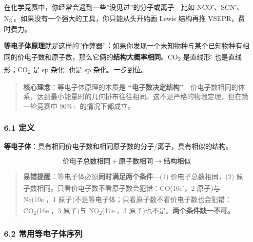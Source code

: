 在化学竞赛中，你经常会遇到一些''没见过''的分子或离子---比如 NCO\textsuperscript{-}、SCN\textsuperscript{-}、N\textsubscript{3}\textsuperscript{-}。如果没有一个强大的工具，你只能从头开始画 Lewis 结构再推 VSEPR，费时费力。

\textbf{等电子体原理}就是这样的''作弊器''：如果你发现一个未知物种与某个已知物种有相同的价电子数和原子数，那么它俩的\textbf{结构大概率相同}。CO\textsubscript{2} 是直线形\textsuperscript{-} 也是直线形；CO\textsubscript{2} 是 sp 杂化\textsuperscript{-} 也是 sp 杂化。一步到位。

\begin{quote}
\textbf{核心理念}：等电子体原理的本质是 \textbf{``电子数决定结构''}---价电子数相同的体系，达到最小能量时的几何排布往往相同。这不是严格的物理定理，但在第一轮竞赛中 90\%+ 的情况下都成立。
\end{quote}

\subsubsection{6.1 定义}\label{ux5b9aux4e49}

\textbf{等电子体}：具有相同价电子数和相同原子数的分子/离子，具有相似的结构。

\[
\text{价电子总数相同} + \text{原子数相同} \rightarrow \text{结构相似}
\]

\begin{quote}
\textbf{易错提醒}：等电子体必须\textbf{同时满足两个条件}---(1) 价电子总数相同，(2) 原子数相同。只看价电子数不看原子数会犯错：CO(10e\textsuperscript{-}，2 原子)与 Ne(10e\textsuperscript{-}，1 原子)不是等电子体；只看原子数不看价电子数也会犯错：CO\textsubscript{2}(16e\textsuperscript{-}，3 原子)与 NO\textsubscript{2}(17e\textsuperscript{-}，3 原子)也不是。\textbf{两个条件缺一不可。}
\end{quote}

\subsubsection{6.2 常用等电子体序列}\label{ux5e38ux7528ux7b49ux7535ux5b50ux4f53ux5e8fux5217}

